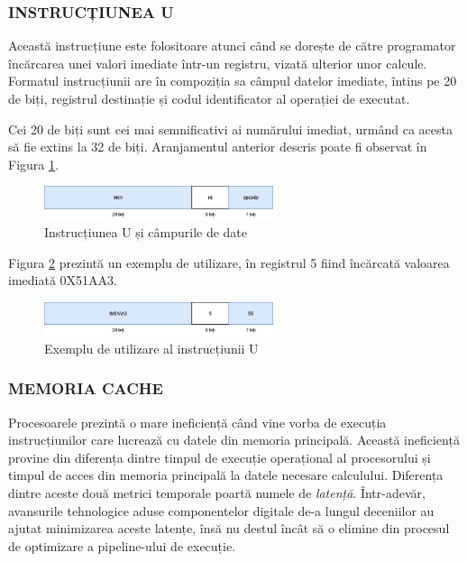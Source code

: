 \documentclass[12pt]{article}
\begin{document}
 \subsubsection{INSTRUCȚIUNEA U}
 Această instrucțiune este folositoare atunci când se dorește de către programator încărcarea unei valori imediate într-un registru, vizată ulterior unor calcule. Formatul instrucțiunii are în compoziția sa câmpul datelor imediate, întins pe 20 de biți, registrul destinație și codul identificator al operației de executat.
 
  Cei 20 de biți sunt cei mai semnificativi ai numărului imediat, urmând ca acesta să fie extins la 32 de biți. Aranjamentul anterior descris poate fi observat în Figura \ref{Figura:22}.
 \begin{figure}[h!]
 \includegraphics[width=0.6\textwidth]{utype.png}
 \centering
 \caption{Instrucțiunea U și câmpurile de date}
 \label{Figura:22}
 \end{figure}

Figura \ref{Figura:23} prezintă un exemplu de utilizare, în registrul 5 fiind încărcată valoarea imediată 0X51AA3.

 \begin{figure}[h!]
 \includegraphics[width=0.6\textwidth]{utypeexample.png}
 \centering
 \caption{Exemplu de utilizare al instrucțiunii U}
 \label{Figura:23}
 \end{figure}

\newpage
\subsubsection{MEMORIA CACHE}

Procesoarele prezintă o mare ineficiență când vine vorba de execuția instrucțiunilor care lucrează cu datele din memoria principală. Această ineficiență provine din diferența dintre timpul de execuție operațional al procesorului și timpul de acces din memoria principală la datele necesare calculului. Diferența dintre aceste două metrici temporale poartă numele de \textit{latență}. Într-adevăr, avansurile tehnologice aduse componentelor digitale de-a lungul deceniilor au ajutat minimizarea aceste latențe, însă nu destul încât să o elimine din procesul de optimizare a pipeline-ului de execuție.
\end{document}
